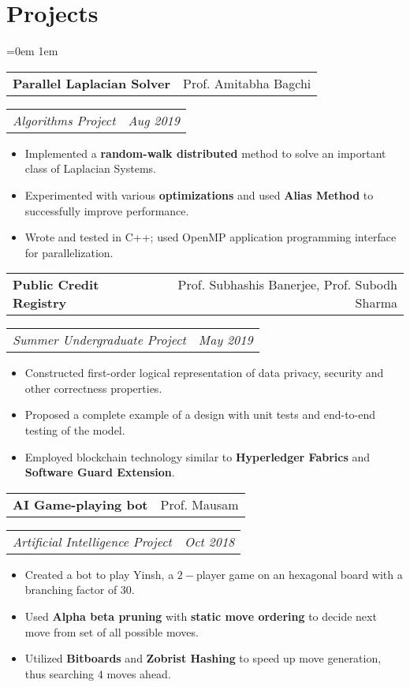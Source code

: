 \documentclass{article}
\makeatletter
\newcommand{\headerrow}[2]
{\begin{tabular*}{\linewidth}{l@{\extracolsep{\fill}}r}
    #1 &
    #2 \\
\end{tabular*}}
\makeatother
\begin{document}
\section*{Projects}
\begin{list} {}{\leftmargin=0em}
\setlength{\leftmargin}{0pt}
\itemsep1em
\item[]
    \headerrow {\textbf{Parallel Laplacian Solver}}{Prof. Amitabha Bagchi}
    \headerrow {\emph{Algorithms Project}}{\emph{Aug 2019}}

    \begin{itemize}[noitemsep,nolistsep]
        \item
            Implemented a \textbf{random-walk distributed} method to solve an
            important class of Laplacian Systems.
        \item
            Experimented with various \textbf{optimizations} and used
            \textbf{Alias Method} to successfully improve performance.
        \item
            Wrote and tested in C++; used OpenMP application programming
            interface for parallelization.
    \end{itemize}

\item[]
    \headerrow {\textbf{Public Credit Registry}}{Prof. Subhashis Banerjee, Prof.
        Subodh Sharma}
    \headerrow {\emph{Summer Undergraduate Project}}{\emph{May 2019}}

    \begin{itemize}[noitemsep,nolistsep]
        \item
            Constructed first-order logical representation of data
            privacy, security and other correctness properties.
        \item
            Proposed a complete example of a design with unit tests and
            end-to-end testing of the model.
        \item
            Employed blockchain technology similar to \textbf{Hyperledger
            Fabrics} and \textbf{Software Guard Extension}.
    \end{itemize}

\item[]
    \headerrow {\textbf{AI Game-playing bot}}{Prof. Mausam}
    \headerrow {\emph{Artificial Intelligence Project}}{\emph{Oct 2018}}

    \begin{itemize}[noitemsep,nolistsep]
        \item
            Created a bot to play Yinsh, a $2-$player game on an hexagonal board
            with a branching factor of $30$.
        \item
            Used \textbf{Alpha beta pruning} with \textbf{static move ordering}
            to decide next move from set of all possible moves.
        \item
            Utilized \textbf{Bitboards} and \textbf{Zobrist Hashing} to speed up
            move generation, thus searching $4$ moves ahead.
    \end{itemize}


\end{list}
\end{document}

